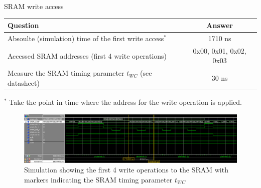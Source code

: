 \documentclass[10pt,a4paper,titlepage,oneside]{article}
\begin{document}

\begin{qa}{SRAM write access}

\begin{center}
\begin{tabular}{lc}
	\hline
	Question & Answer \\
	\hline\hline
	Absoulte (simulation) time of the first write access$^{*}$ & 1710 ns \\
	Accessed SRAM addresses (first 4 write operations)         & 0x00, 0x01, 0x02, 0x03 \\
	Measure the SRAM timing parameter $t_{WC}$ (see datasheet) & 30 ns\\\hline
\end{tabular}

\footnotesize{$^{*}$ Take the point in time where the address for the write operation is applied.}
\end{center}

\begin{figure}[h!]
	\centering
	\includegraphics[width=1.0\linewidth]{dia/Subtask3.png}
	\caption{Simulation showing the first 4 write operations to the SRAM with markers indicating the SRAM timing parameter $t_{WC}$}
\end{figure}

\end{qa}
\end{document}
